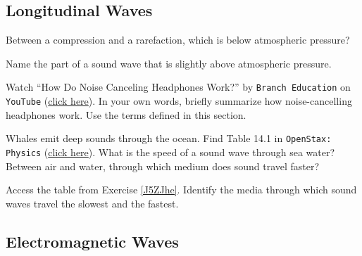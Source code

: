 \documentclass[../main-physics-problems.tex]{subfiles}
\begin{document}




\subsection{Longitudinal Waves}

\begin{questions}
    
\question
Between a compression and a rarefaction, which is below atmospheric pressure?


\question
Name the part of a sound wave that is slightly above atmospheric pressure.


\question
Watch ``How Do Noise Canceling Headphones Work?'' by \texttt{Branch Education} on \texttt{YouTube} (\href{https://youtu.be/VIi04uD8LtY}{click here}). In your own words, briefly summarize how noise-cancelling headphones work. Use the terms defined in this section.


\question \label{J5ZJhe}
Whales emit deep sounds through the ocean. Find Table 14.1 in \texttt{OpenStax: Physics} (\href{https://openstax.org/books/physics/pages/14-1-speed-of-sound-frequency-and-wavelength#Table_14_01}{click here}). What is the speed of a sound wave through sea water? Between air and water, through which medium does sound travel faster?


\question
Access the table from Exercise \ref{J5ZJhe}. Identify the media through which sound waves travel the slowest and the fastest.

\end{questions}

\clearpage
\subsection{Electromagnetic Waves}
\end{document}
